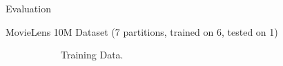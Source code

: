 \documentclass[final]{beamer}
\begin{document}
{\begin{frame}{}
\begin{center}
\begin{columns}[t]
\begin{column}{0.32\textwidth}
\begin{block}{\huge Evaluation}
\begin{itemize}
{\item MovieLens 10M Dataset (7 partitions, trained on 6, tested on 1)
\begin{figure}
	\begin{subfigure}[b]{.45\textwidth}
\begin{center}
		\caption{Training Data.}
\end{center}
	\end{subfigure}
\hspace{1cm}
	\begin{subfigure}[b]{.45\textwidth}
\begin{center}

\end{center}
\end{subfigure}
\end{figure}}
\end{itemize}
\end{block}
\end{column}
\end{columns}
\end{center}
\end{frame}}
\end{document}
